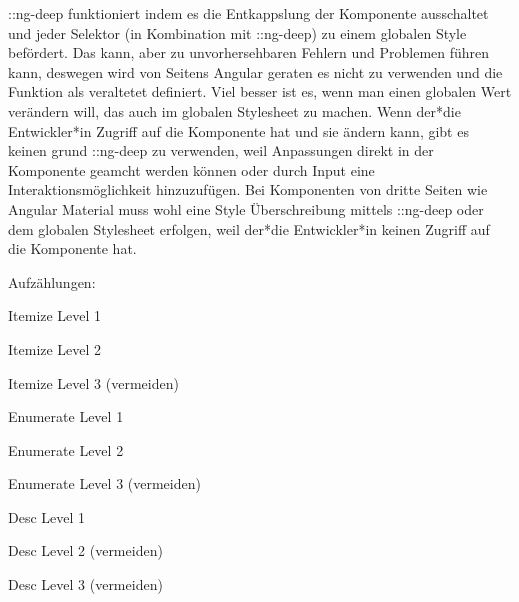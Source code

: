 ::ng-deep funktioniert indem es die Entkappslung der Komponente ausschaltet und jeder Selektor (in Kombination mit ::ng-deep) zu einem globalen Style befördert. Das kann, aber zu unvorhersehbaren Fehlern und Problemen führen kann, deswegen wird von Seitens Angular geraten es nicht zu verwenden und die Funktion als veraltetet definiert. Viel besser ist es, wenn man einen globalen Wert verändern will, das auch im globalen Stylesheet zu machen. 
Wenn der*die Entwickler*in Zugriff auf die Komponente hat und sie ändern kann, gibt es keinen grund ::ng-deep zu verwenden, weil Anpassungen direkt in der Komponente geamcht werden können oder durch Input eine Interaktionsmöglichkeit hinzuzufügen. Bei Komponenten von dritte Seiten wie Angular Material muss wohl eine Style Überschreibung mittels ::ng-deep oder dem globalen Stylesheet erfolgen, weil der*die Entwickler*in keinen Zugriff auf die Komponente hat. 
\cite{AngularComponentsStyleNgDEEP}
\cite{UnderstandingNgDeep}


Aufzählungen:

\begin{compactitem}
    \item Itemize Level 1
    \begin{compactitem}
        \item Itemize Level 2
        \begin{compactitem}
            \item Itemize Level 3 (vermeiden)
        \end{compactitem}
    \end{compactitem}
\end{compactitem}

\begin{compactenum}
    \item Enumerate Level 1
    \begin{compactenum}
        \item Enumerate Level 2
        \begin{compactenum}
            \item Enumerate Level 3 (vermeiden)
        \end{compactenum}
    \end{compactenum}
\end{compactenum}

\begin{compactdesc}
    \item[Desc] Level 1
    \begin{compactdesc}
        \item[Desc] Level 2 (vermeiden)
        \begin{compactdesc}
            \item[Desc] Level 3 (vermeiden)
        \end{compactdesc}
    \end{compactdesc}
\end{compactdesc}

